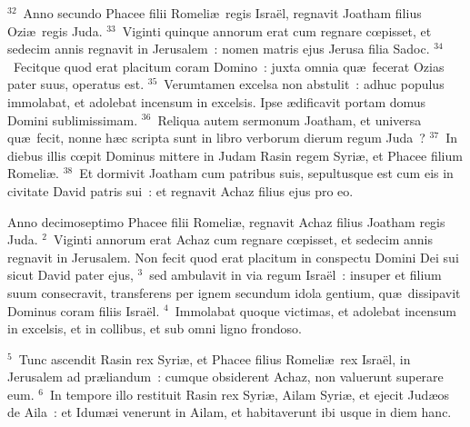 ${}^{32}$~Anno secundo Phacee filii Romeli\ae\ regis Isra\"el, regnavit Joatham filius Ozi\ae\ regis Juda.
${}^{33}$~Viginti quinque annorum erat cum regnare cœpisset, et sedecim annis regnavit in Jerusalem~: nomen matris ejus Jerusa filia Sadoc.
${}^{34}$~Fecitque quod erat placitum coram Domino~: juxta omnia qu\ae\ fecerat Ozias pater suus, operatus est.
${}^{35}$~Verumtamen excelsa non abstulit~: adhuc populus immolabat, et adolebat incensum in excelsis. Ipse \ae dificavit portam domus Domini sublimissimam.
${}^{36}$~Reliqua autem sermonum Joatham, et universa qu\ae\ fecit, nonne h\ae c scripta sunt in libro verborum dierum regum Juda~?
${}^{37}$~In diebus illis cœpit Dominus mittere in Judam Rasin regem Syri\ae , et Phacee filium Romeli\ae .
${}^{38}$~Et dormivit Joatham cum patribus suis, sepultusque est cum eis in civitate David patris sui~: et regnavit Achaz filius ejus pro eo.

\bchapter
\lettrine[lines=3,image=true,loversize=0.05,lraise=-0.03]{A}{}nno decimoseptimo Phacee filii Romeli\ae , regnavit Achaz filius Joatham regis Juda.
${}^{2}$~Viginti annorum erat Achaz cum regnare cœpisset, et sedecim annis regnavit in Jerusalem. Non fecit quod erat placitum in conspectu Domini Dei sui sicut David pater ejus,
${}^{3}$~sed ambulavit in via regum Isra\"el~: insuper et filium suum consecravit, transferens per ignem secundum idola gentium, qu\ae\ dissipavit Dominus coram filiis Isra\"el.
${}^{4}$~Immolabat quoque victimas, et adolebat incensum in excelsis, et in collibus, et sub omni ligno frondoso.


${}^{5}$~Tunc ascendit Rasin rex Syri\ae , et Phacee filius Romeli\ae\ rex Isra\"el, in Jerusalem ad pr\ae liandum~: cumque obsiderent Achaz, non valuerunt superare eum.
${}^{6}$~In tempore illo restituit Rasin rex Syri\ae , Ailam Syri\ae , et ejecit Jud\ae os de Aila~: et Idum\ae i venerunt in Ailam, et habitaverunt ibi usque in diem hanc.


